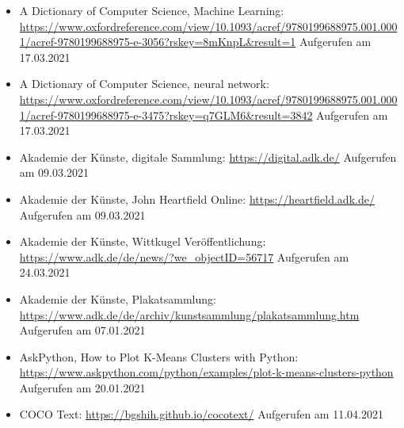 \documentclass[a4paper,12pt,ngerman]{article}
\begin{document}
\begin{itemize}
\item A Dictionary of Computer Science, Machine Learning: \newline \href{https://www.oxfordreference.com/view/10.1093/acref/9780199688975.001.0001/acref-9780199688975-e-3056?rskey=8mKnpL\&result=1}{https://www.oxfordreference.com/view/10.1093/acref/9780199688975.001.0001/acref-9780199688975-e-3056?rskey=8mKnpL\&result=1} \newline Aufgerufen am 17.03.2021
\item A Dictionary of Computer Science, neural network: \newline \href{https://www.oxfordreference.com/view/10.1093/acref/9780199688975.001.0001/acref-9780199688975-e-3475?rskey=q7GLM6\&result=3842}{https://www.oxfordreference.com/view/10.1093/acref/9780199688975.001.0001/acref-9780199688975-e-3475?rskey=q7GLM6\&result=3842} \newline Aufgerufen am 17.03.2021
\item Akademie der Künste, digitale Sammlung: \newline \href{https://digital.adk.de/}{https://digital.adk.de/} \newline Aufgerufen am 09.03.2021
\item Akademie der Künste, John Heartfield Online: \newline \href{https://heartfield.adk.de/}{https://heartfield.adk.de/} \newline Aufgerufen am 09.03.2021
\item Akademie der Künste, Wittkugel Veröffentlichung: \newline \href{https://www.adk.de/de/news/?we_objectID=56717}{https://www.adk.de/de/news/?we\_objectID=56717} \newline Aufgerufen am 24.03.2021
\item Akademie der Künste, Plakatsammlung: \newline \href{https://www.adk.de/de/archiv/kunstsammlung/plakatsammlung.htm}{https://www.adk.de/de/archiv/kunstsammlung/plakatsammlung.htm} \newline Aufgerufen am 07.01.2021
\item AskPython, How to Plot K-Means Clusters with Python: \newline \href{https://www.askpython.com/python/examples/plot-k-means-clusters-python}{https://www.askpython.com/python/examples/plot-k-means-clusters-python} \newline Aufgerufen am 20.01.2021
\item COCO Text: \newline \href{https://bgshih.github.io/cocotext/}{https://bgshih.github.io/cocotext/} \newline Aufgerufen am 11.04.2021

\end{itemize}
\end{document}
